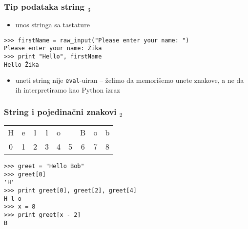 \documentclass[utf8,compress]{beamer}
\begin{document}
\begin{frame}[fragile]
  \frametitle{Tip podataka string $_3$}
  \begin{itemize}
    \item unos stringa sa tastature
  \end{itemize}
\begin{verbatim}
>>> firstName = raw_input("Please enter your name: ")
Please enter your name: Žika
>>> print "Hello", firstName
Hello Žika
\end{verbatim}
  \begin{itemize}
    \item uneti string nije \texttt{eval}-uiran -- želimo da memorišemo unete znakove, a ne da ih interpretiramo kao Python izraz
  \end{itemize}
\end{frame}


\begin{frame}[fragile]
  \frametitle{String i pojedinačni znakovi $_2$}
\begin{tabular}{|c|c|c|c|c|c|c|c|c|}
\cline{1-9}
H & e & l & l & o & \  & B & o & b \\ \cline{1-9}
\multicolumn{1}{c}{0} & \multicolumn{1}{c}{1} & \multicolumn{1}{c}{2} & \multicolumn{1}{c}{3} & \multicolumn{1}{c}{4} & \multicolumn{1}{c}{5} & \multicolumn{1}{c}{6} & \multicolumn{1}{c}{7} & \multicolumn{1}{c}{8}
\end{tabular}
\begin{verbatim}
>>> greet = "Hello Bob"
>>> greet[0]
'H'
>>> print greet[0], greet[2], greet[4]
H l o
>>> x = 8
>>> print greet[x - 2]
B
\end{verbatim}
\end{frame}
\end{document}
